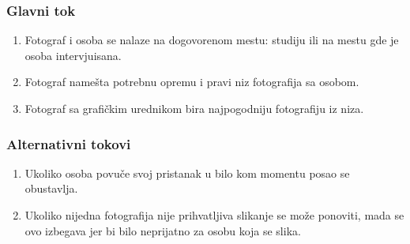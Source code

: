 \subsubsection{Glavni tok}
\begin{enumerate} 
\item Fotograf i osoba se nalaze na dogovorenom mestu: studiju ili na mestu gde je osoba intervjuisana.
\item Fotograf namešta potrebnu opremu i pravi niz fotografija sa osobom.
\item Fotograf sa grafičkim urednikom bira najpogodniju fotografiju iz niza.
\end{enumerate}
\subsubsection{Alternativni tokovi}
\begin{enumerate} 
\item Ukoliko osoba povuče svoj pristanak u bilo kom momentu posao se obustavlja.
\item Ukoliko nijedna fotografija nije prihvatljiva slikanje se može ponoviti, mada se ovo izbegava jer bi bilo neprijatno za osobu koja se slika.
\end{enumerate}
